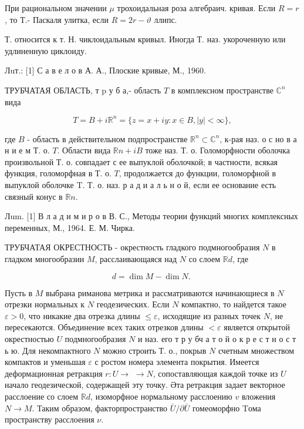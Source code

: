\documentclass[10pt]{article}
\begin{document}
При рациональном значении $\mu$ трохоидальная роза алгебраич. кривая. Если $R=r$, то Т.- Паскаля улитка, если $R=2 r-\vartheta$ ллипс.



Т. относится к т. Н. чиклоидальным кривыл. Иногда Т. наз. укороченную или удлиненную циклоиду.



Лuт.: [1] С а в е л о в А. А., Плоские кривые, М., 1960.



ТРУБЧАТАЯ ОБЛАСТЬ, т $\mathrm{p}$ у б а,- область $T$ в комплексном пространстве $\mathbb{C}^{n}$ вида



\[

T=B+i \mathbb{R}^{n}=\{z=x+i y: x \in B,|y|<\infty\},

\]



где $B$ - область в действительном подпространстве $\mathbb{R}^{n} \subset \mathbb{C}^{n}$, к-рая наз. о с но в а н и е м Т. о. $T$. Области вида $\mathbb{R} n+i B$ тоже наз. Т. о. Голоморфности оболочка произвольной Т. о. совпадает с ее выпуклой оболочкой; в частности, всякая функция, голоморфная в Т. о. $T$, продолжается до функции, голоморфной в выпуклой оболочке T. Т. о. наз. р а д и а л ь н о й, если ее основание есть связный конус в $\mathbb{R} n$.



Лum. [1] В л а д и м и р о в В. С., Методы теории функций многих комплексных переменных, М., 1964. Е. М. Чирка.



ТРУБЧАТАЯ ОКРЕСТНОСТЬ - окрестность гладкого подмногообразия $N$ в гладком многообразии $M$, расслаивающаяся над $N$ со слоем $\mathbb{R} d$, где



\[

d=\operatorname{dim} M-\operatorname{dim} N \text {. }

\]



Пусть в $M$ выбрана риманова метрика и рассматриваются начинающиеся в $N$ отрезки нормальных к $N$ геодезических. Если $N$ компактно, то найдется такое $\varepsilon>0$, что никакие два отрезка длины $\leqslant \varepsilon$, исходящие из разных точек $N$, не пересекаются. Объединение всех таких отрезков длины $<\varepsilon$ является открытой окрестностью $U$ подмногообразия $N$ и наз. его т р у бч а т о й $о$ к р е с т н о с т ь ю. Для некомпактного $N$ можно строить Т. о., покрыв $N$ счетным множеством компактов и уменьшая $\varepsilon$ с ростом номера элемента покрытия. Имеется деформационная ретракция $r: U \rightarrow$ $\rightarrow N$, сопоставляющая каждой точке из $U$ начало геодезической, содержащей эту точку. Әта ретракция задает векторное расслоение со слоем $\mathbb{R} d$, изоморфное нормальному расслоению $v$ вложения $N \rightarrow M$. Таким образом, факторпространство $\bar{U} / \partial \bar{U}$ гомеоморфно Tома пространству расслоения $\nu$.
\end{document}
